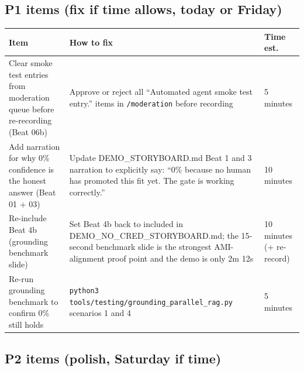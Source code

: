 \subsection{P1 items (fix if time allows, today or Friday)}

\begin{center}
\small
\begin{tabular}{p{5.5cm}p{4.5cm}p{2.2cm}}
\toprule
\textbf{Item} & \textbf{How to fix} & \textbf{Time est.} \\
\midrule

Clear smoke test entries from moderation queue before re-recording (Beat 06b) &
Approve or reject all ``Automated agent smoke test entry.'' items in \texttt{/moderation} before recording &
5 minutes \\

\midrule

Add narration for why 0\% confidence is the honest answer (Beat 01 + 03) &
Update DEMO\_STORYBOARD.md Beat 1 and 3 narration to explicitly say: ``0\% because no human has promoted this fit yet. The gate is working correctly.'' &
10 minutes \\

\midrule

Re-include Beat 4b (grounding benchmark slide) &
Set Beat 4b back to included in DEMO\_NO\_CRED\_STORYBOARD.md; the 15-second benchmark slide is the strongest AMI-alignment proof point and the demo is only 2m 12s &
10 minutes (+ re-record) \\

\midrule

Re-run grounding benchmark to confirm 0\% still holds &
\texttt{python3 tools/testing/grounding\_parallel\_rag.py} scenarios 1 and 4 &
5 minutes \\

\bottomrule
\end{tabular}
\end{center}

\subsection{P2 items (polish, Saturday if time)}

